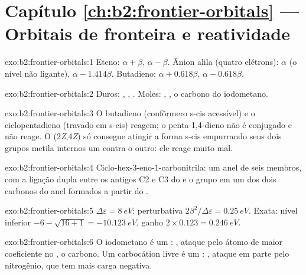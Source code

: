 \section*{Capítulo \ref{ch:b2:frontier-orbitals} --- Orbitais de fronteira e reatividade}

\begin{solution}{exo:b2:frontier-orbitals:1}
Eteno:  $\alpha + \beta$,  $\alpha - \beta$. Ânion alila (quatro elétrons):  $\alpha$ (o
nível não ligante),  $\alpha - 1.414\beta$. Butadieno:  $\alpha + 0.618\beta$,  $\alpha -
0.618\beta$.
\end{solution}

\begin{solution}{exo:b2:frontier-orbitals:2}
Duros: , , . Moles: , , o carbono do iodometano.
\end{solution}

\begin{solution}{exo:b2:frontier-orbitals:3}
O butadieno (confôrmero s-cis acessível) e o ciclopentadieno (travado em s-cis)
reagem; o penta-1,4-dieno não é conjugado e não reage. O  (2\textit{Z},4\textit{Z}) só
consegue atingir a forma s-cis empurrando seus dois grupos metila internos um
contra o outro: ele reage muito mal.
\end{solution}

\begin{solution}{exo:b2:frontier-orbitals:4}
Ciclo-hex-3-eno-1-carbonitrila: um anel de seis membros, com a ligação dupla
entre os antigos C2 e C3 do  e o grupo  em um dos dois carbonos
do anel formados a partir do .
\end{solution}

\begin{solution}{exo:b2:frontier-orbitals:5}
$\Delta\varepsilon = \qty{8}{eV}$: perturbativa $2\beta^2/\Delta\varepsilon = \qty{0.25}{eV}$. Exata: nível
inferior $-6 - \sqrt{16 + 1} = \qty{-10.123}{eV}$, ganho $2 \times 0.123 = \qty{0.246}{eV}$.
\end{solution}

\begin{solution}{exo:b2:frontier-orbitals:6}
O iodometano é um : , ataque pelo átomo de
maior coeficiente no , o carbono. Um carbocátion livre é um : , ataque em parte pelo nitrogênio, que tem mais carga
negativa.
\end{solution}

